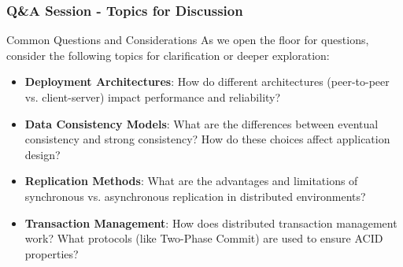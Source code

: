 \documentclass[aspectratio=169]{beamer}
\begin{document}
\begin{frame}[fragile]
  \frametitle{Q\&A Session - Topics for Discussion}
  \begin{block}{Common Questions and Considerations}
    As we open the floor for questions, consider the following topics for clarification or deeper exploration:
  \end{block}

  \begin{itemize}
    \item \textbf{Deployment Architectures}: How do different architectures (peer-to-peer vs. client-server) impact performance and reliability?
    
    \item \textbf{Data Consistency Models}: What are the differences between eventual consistency and strong consistency? How do these choices affect application design?
    
    \item \textbf{Replication Methods}: What are the advantages and limitations of synchronous vs. asynchronous replication in distributed environments?
    
    \item \textbf{Transaction Management}: How does distributed transaction management work? What protocols (like Two-Phase Commit) are used to ensure ACID properties?
  \end{itemize}
\end{frame}
\end{document}
